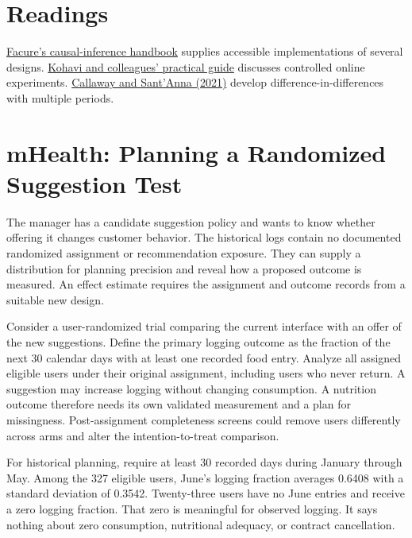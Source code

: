\hypertarget{M06-readings}{%
\section{Readings}\label{M06-readings}}

\noindent \href{https://matheusfacure.github.io/python-causality-handbook/landing-page.html}{Facure's
causal-inference handbook} supplies accessible implementations of
several designs.
\href{https://exp-platform.com/Documents/GuideControlledExperiments.pdf}{Kohavi
and colleagues' practical guide} discusses controlled online
experiments.
\href{https://doi.org/10.1016/j.jeconom.2020.12.001}{Callaway and
Sant'Anna (2021)} develop difference-in-differences with multiple
periods.

\hypertarget{M06-mhealth-planning-a-randomized-suggestion-test}{%
\section{mHealth: Planning a Randomized Suggestion
Test}\label{M06-mhealth-planning-a-randomized-suggestion-test}}

\noindent The manager has a candidate suggestion policy and wants to know whether
offering it changes customer behavior. The historical logs contain no
documented randomized assignment or recommendation exposure. They can
supply a distribution for planning precision and reveal how a proposed
outcome is measured. An effect estimate requires the assignment and
outcome records from a suitable new design.

Consider a user-randomized trial comparing the current interface with an
offer of the new suggestions. Define the primary logging outcome as the
fraction of the next 30 calendar days with at least one recorded food
entry. Analyze all assigned eligible users under their original
assignment, including users who never return. A suggestion may increase
logging without changing consumption. A nutrition outcome therefore
needs its own validated measurement and a plan for missingness.
Post-assignment completeness screens could remove users differently
across arms and alter the intention-to-treat comparison.

For historical planning, require at least 30 recorded days during
January through May. Among the 327 eligible users, June's logging
fraction averages 0.6408 with a standard deviation of 0.3542.
Twenty-three users have no June entries and receive a zero logging
fraction. That zero is meaningful for observed logging. It says nothing
about zero consumption, nutritional adequacy, or contract cancellation.

